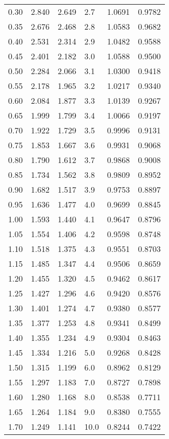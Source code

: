 \begin{longtable}{p{1cm}p{1.8cm}p{2cm}|p{1.3cm}p{1.8cm}p{2cm}}
    0.30 & 2.840 & 2.649 & 2.7 & 1.0691 & 0.9782 \\
    0.35 & 2.676 & 2.468 & 2.8 & 1.0583 & 0.9682 \\
    0.40 & 2.531 & 2.314 & 2.9 & 1.0482 & 0.9588 \\
    0.45 & 2.401 & 2.182 & 3.0 & 1.0588 & 0.9500 \\
    0.50 & 2.284 & 2.066 & 3.1 & 1.0300 & 0.9418 \\
    0.55 & 2.178 & 1.965 & 3.2 & 1.0217 & 0.9340 \\
    0.60 & 2.084 & 1.877 & 3.3 & 1.0139 & 0.9267 \\
    0.65 & 1.999 & 1.799 & 3.4 & 1.0066 & 0.9197 \\
    0.70 & 1.922 & 1.729 & 3.5 & 0.9996 & 0.9131 \\
    0.75 & 1.853 & 1.667 & 3.6 & 0.9931 & 0.9068 \\
    0.80 & 1.790 & 1.612 & 3.7 & 0.9868 & 0.9008 \\
    0.85 & 1.734 & 1.562 & 3.8 & 0.9809 & 0.8952 \\
    0.90 & 1.682 & 1.517 & 3.9 & 0.9753 & 0.8897 \\
    0.95 & 1.636 & 1.477 & 4.0 & 0.9699 & 0.8845 \\
    1.00 & 1.593 & 1.440 & 4.1 & 0.9647 & 0.8796 \\
    1.05 & 1.554 & 1.406 & 4.2 & 0.9598 & 0.8748 \\
    1.10 & 1.518 & 1.375 & 4.3 & 0.9551 & 0.8703 \\
    1.15 & 1.485 & 1.347 & 4.4 & 0.9506 & 0.8659 \\
    1.20 & 1.455 & 1.320 & 4.5 & 0.9462 & 0.8617 \\
    1.25 & 1.427 & 1.296 & 4.6 & 0.9420 & 0.8576 \\
    1.30 & 1.401 & 1.274 & 4.7 & 0.9380 & 0.8577 \\
    1.35 & 1.377 & 1.253 & 4.8 & 0.9341 & 0.8499 \\
    1.40 & 1.355 & 1.234 & 4.9 & 0.9304 & 0.8463 \\
    1.45 & 1.334 & 1.216 & 5.0 & 0.9268 & 0.8428 \\
    1.50 & 1.315 & 1.199 & 6.0 & 0.8962 & 0.8129 \\
    1.55 & 1.297 & 1.183 & 7.0 & 0.8727 & 0.7898 \\
    1.60 & 1.280 & 1.168 & 8.0 & 0.8538 & 0.7711 \\
    1.65 & 1.264 & 1.184 & 9.0 & 0.8380 & 0.7555 \\
    1.70 & 1.249 & 1.141 & 10.0 & 0.8244 & 0.7422 \\

\end{longtable}
